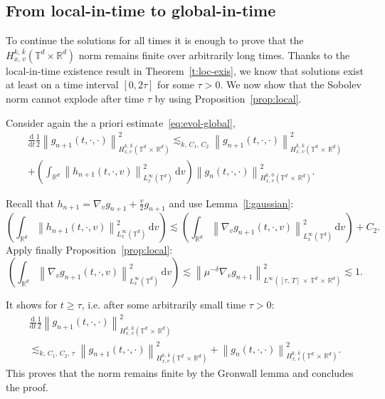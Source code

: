 \documentclass[10pt]{amsart}
\theoremstyle{definition}\newtheorem{defi}[theo]{Definition}\newtheorem{rema}[theo]{Remark}\newtheorem{exam}[theo]{Example}\newtheorem{exem}[theo]{Example}\newtheorem{nota}[theo]{Notation}
\newcommand{\R}{\mathbb{R}}
\newcommand{\T}{\mathbb{T}}
\newcommand\dt{{\frac{\mathrm d}{\mathrm dt}}}
\newcommand{\dd}{{\, \mathrm d}}
\begin{document}
\subsection{From local-in-time to global-in-time}\label{sec:from-local-time}

To continue the solutions for all times it is enough to prove that the $H^{k,\,\bar k}_{x,\,v}(\T^d \times \R^d)$ norm remains finite over arbitrarily long times. Thanks to the local-in-time existence result in Theorem~\ref{t:loc-exis}, we know that solutions exist at least on a time interval $[0,2 \tau]$ for some $\tau>0$. We now show that the Sobolev norm cannot explode after time $\tau$ by using Proposition~\ref{prop:local}.

Consider again the a priori estimate~\eqref{eq:evol-global},
\begin{multline*}
\dt \frac12 \left\| g_{n+1}(t,\cdot,\cdot) \right\|_{H^{k,\,\bar k}_{x,v}\left(\T^d\,\times\,\R^d\right)}^2  \lesssim_{k,\,C_1,\,C_2} \left\| g_{n+1}(t,\cdot,\cdot)
\right\|_{H^{\bar k,\,\bar k}_{x,\,v}\left(\T^d\,\times\, \R^d\right)}^2 \\
+ \left(\int_{\R^d} \left\| h_{n+1}(t,\cdot,v)
\right\|_{L^\infty_x(\T^d)}^2 \dd v \right)
\left\| g_n(t,\cdot,\cdot) \right\|_{H^{k,\,0}_{x,\,v}\left(\T^d\,\times\,\R^d\right)}^2.
\end{multline*}

Recall that $h_{n+1} = \nabla_v g_{n+1} + \frac{v}{2} g_{n+1}$ and use Lemma~\ref{l:gaussian}:
\[
\left(\int_{\R^d} \left\| h_{n+1}(t,\cdot,v)
\right\|_{L^\infty_x(\T^d)}^2 \dd v \right)
\lesssim \left(\int_{\R^d} \left\| \nabla_v g_{n+1}(t,\cdot,v)
\right\|_{L^\infty_x(\T^d)}^2 \dd v \right) + C_2.
\]
Apply finally Proposition~\ref{prop:local}:
\[
\left(\int_{\R^d} \left\|\nabla_v g_{n+1}(t,\cdot,v) \right\|_{L^\infty_x(\T^d)}^2 \dd v
\right) \lesssim \left\| \mu^{-\delta} \nabla_v g_{n+1} \right\|^2_{L^\infty\left([\tau,\,T]\,\times\,
\T^d\,\times\,\R^d\right)} \lesssim 1.
\]

It shows for $t \ge \tau$, i.e. after some arbitrarily small time $\tau>0$:
\begin{multline*}
\dt \frac12 \left\| g_{n+1}(t,\cdot,\cdot) \right\|_{H^{k,\,\bar k}_{x,\,v}\left(\T^d\,\times\,\R^d\right)}^2\\
\lesssim_{k,\,C_1,\,C_2,\,\tau} \left\| g_{n+1}(t,\cdot,\cdot)
\right\|_{H^{k,\,\bar k}_{x,v}\left(\T^d\,\times\,\R^d\right)}^2 +
\left\| g_n(t,\cdot,\cdot) \right\|_{H^{k,\,\bar k}_{x,\,v}\left(\T^d\,\times\,\R^d\right)}^2.
\end{multline*}
This proves that the norm remains finite by the Gronwall lemma and concludes the proof.
\end{document}
